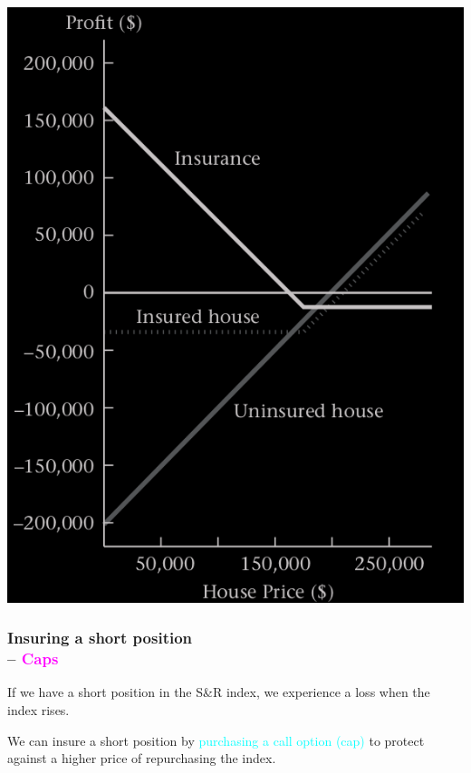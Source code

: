 \begin{frame}[fragile]
\begin{center}
	\includegraphics[scale=0.2]{figs/Figure-3-2.png}
\end{center}
\end{frame}
\begin{frame}[fragile,t]
	\frametitle{Insuring a short position \\ -- \textcolor{magenta}{Caps}}

If we have a short position in the S\&R index, we experience a loss when the index rises.
\bigskip

We can insure a short position by \textcolor{cyan}{purchasing a call option (cap)} to protect against a
higher price of repurchasing the index.

\end{frame}
